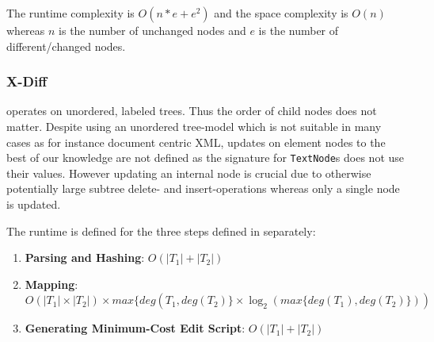 The runtime complexity is $O(n*e+e^2)$ and the space complexity is $O(n)$ whereas $n$ is the number of unchanged nodes and $e$ is the number of different/changed nodes.

\subsubsection{X-Diff\cite{wang2003x}}
operates on unordered, labeled trees. Thus the order of child nodes does not matter. Despite using an unordered tree-model which is not suitable in many cases as for instance document centric XML, updates on element nodes to the best of our knowledge are not defined as the signature for \texttt{TextNode}s does not use their values. However updating an internal node is crucial due to otherwise potentially large subtree delete- and insert-operations whereas only a single node is updated.






The runtime is defined for the three steps defined in \cite{wang2003x} separately: 

\begin{enumerate}
\item {\bf{Parsing and Hashing}}: $O(|T_{1}| + |T_{2}|)$
\item {\bf{Mapping}}: $O(|T_{1}| \times |T_{2}|) \times max\{deg(T_{1}, deg(T_{2})\} \times \log_{2}(max\{deg(T_{1}), deg(T_{2})\}))$
\item {\bf{Generating Minimum-Cost Edit Script}}: $O(|T_{1}| + |T_{2}|)$
\end{enumerate}

